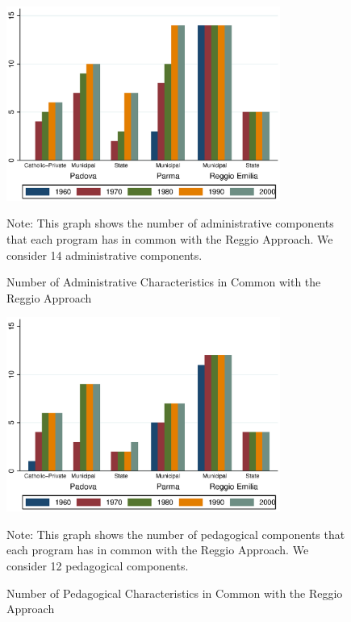 \begin{figure}
\begin{center}
\caption{Number of Administrative Characteristics in Common with the Reggio Approach}
\label{fig:agg-admin}
	\includegraphics[width=0.8\textwidth]{../../output/aggregateAdministrative.eps}
\end{center}
\raggedright \footnotesize Note: This graph shows the number of administrative components that each program has in common with the Reggio Approach. We consider 14 administrative components. 
\end{figure}


\begin{figure}
\begin{center}
\caption{Number of Pedagogical Characteristics in Common with the Reggio Approach}
\label{fig:agg-ped}
	\includegraphics[width=0.8\textwidth]{../../output/aggregatePedagogical.eps}
\end{center}
	\raggedright \footnotesize Note: This graph shows the number of pedagogical components that each program has in common with the Reggio Approach. We consider 12 pedagogical components. 
	\end{figure}